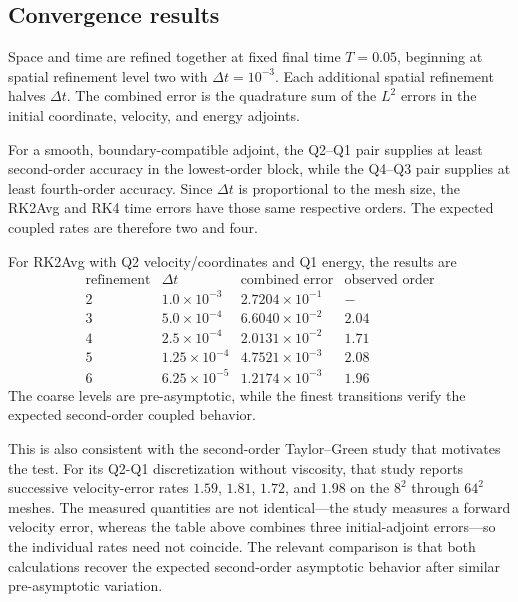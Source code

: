 \documentclass[11pt]{article}
\begin{document}
\subsection{Convergence results}

Space and time are refined together at fixed final time $T=0.05$, beginning
at spatial refinement level two with $\Delta t=10^{-3}$.  Each additional
spatial refinement halves $\Delta t$.  The combined error is the quadrature
sum of the $L^2$ errors in the initial coordinate, velocity, and energy
adjoints.

For a smooth, boundary-compatible adjoint, the Q2--Q1 pair supplies at least
second-order accuracy in the lowest-order block, while the Q4--Q3 pair
supplies at least fourth-order accuracy.  Since $\Delta t$ is proportional
to the mesh size, the RK2Avg and RK4 time errors have those same respective
orders.  The expected coupled rates are therefore two and four.

For RK2Avg with Q2 velocity/coordinates and Q1 energy, the results are
\[
\begin{array}{c|c|c|c}
 \text{refinement} & \Delta t & \text{combined error} &
 \text{observed order}\\ \hline
 2 & 1.0\times10^{-3}  & 2.7204\times10^{-1} & -\\
 3 & 5.0\times10^{-4}  & 6.6040\times10^{-2} & 2.04\\
 4 & 2.5\times10^{-4}  & 2.0131\times10^{-2} & 1.71\\
 5 & 1.25\times10^{-4} & 4.7521\times10^{-3} & 2.08\\
 6 & 6.25\times10^{-5} & 1.2174\times10^{-3} & 1.96
\end{array}
\]
The coarse levels are pre-asymptotic, while the finest transitions verify
the expected second-order coupled behavior.

This is also consistent with the second-order Taylor--Green study that
motivates the test.  For its Q2-Q1 discretization without viscosity, that
study reports successive velocity-error rates $1.59$, $1.81$, $1.72$, and
$1.98$ on the $8^2$ through $64^2$ meshes.  The measured quantities are not
identical---the study measures a forward velocity error, whereas the table
above combines three initial-adjoint errors---so the individual rates need
not coincide.  The relevant comparison is that both calculations recover
the expected second-order asymptotic behavior after similar pre-asymptotic
variation.
\end{document}
